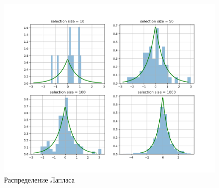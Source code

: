 \documentclass[a4]{article}
\begin{document}
\begin{center}
				\begin{figure}
					\includegraphics[width=\textwidth]{laplace.png}
					\caption[Распределение Лапласа]{Распределение Лапласа}
				\end{figure}
			

\end{center}
\end{document}
